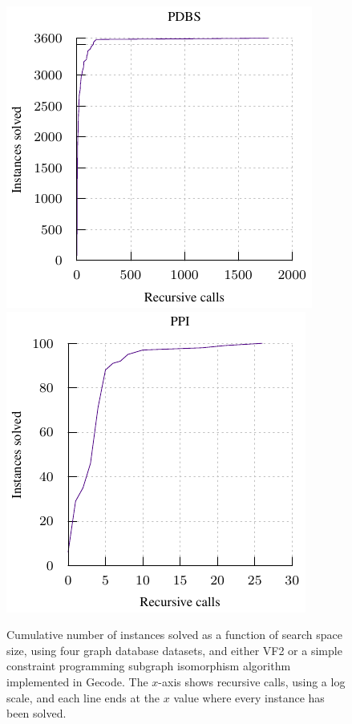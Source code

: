 \documentclass[twoside,11pt]{article}
\begin{document}
\begin{figure}[t]
    \centering
    \hspace*{1em}
    \includegraphics*{plots/biiiig-data-pdbs.pdf}
    \hfill
    \includegraphics*{plots/biiiig-data-ppigo.pdf}
    \hspace*{1em}

    \caption{Cumulative number of instances solved as a function of search space size, using four
    graph database datasets, and either VF2 or a simple constraint programming subgraph isomorphism
    algorithm implemented in Gecode. The $x$-axis shows recursive calls, using a log scale, and each
    line ends at the $x$ value where every instance has been solved.}
    \label{figure:biiiig-data}
\end{figure}
\end{document}
